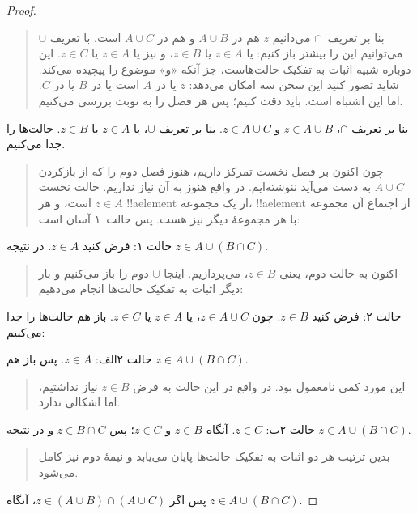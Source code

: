 \documentclass[../../../include/open-logic-section]{subfiles}
\begin{document}
\begin{proof}
\begin{quote}
بنا بر تعریف~$\cap$ می‌دانیم $z$ هم در $A \cup B$ و هم در $A \cup C$
است. با تعریف $\cup$ می‌توانیم این را بیشتر باز کنیم: یا $z \in A$ یا
$z \in B$، و نیز یا $z \in A$ یا $z \in C$. این دوباره شبیه اثبات به
تفکیک حالت‌هاست، جز آنکه «و» موضوع را پیچیده می‌کند. شاید تصور کنید
این سخن سه امکان می‌دهد: $z$ یا در $A$ است یا در $B$ یا در $C$. اما
این اشتباه است. باید دقت کنیم؛ پس هر فصل را به نوبت بررسی می‌کنیم.
\end{quote}
بنا بر تعریف $\cap$، $z \in A \cup B$ و $z \in A \cup C$. بنا بر
تعریف $\cup$، یا $z \in A$ یا $z \in B$. حالت‌ها را جدا می‌کنیم.
\begin{quote}
چون اکنون بر فصل نخست تمرکز داریم، هنوز فصل دوم را که از بازکردن
$A \cup C$ به دست می‌آید ننوشته‌ایم. در واقع هنوز به آن نیاز نداریم.
حالت نخست $z \in A$ است، و هر !!a{element} از یک مجموعه، !!a{element}
از اجتماع آن مجموعه با هر مجموعهٔ دیگر نیز هست. پس حالت~۱ آسان است:
\end{quote}
حالت ۱: فرض کنید $z \in A$. در نتیجه $z \in A \cup (B \cap C)$.
\begin{quote}
اکنون به حالت دوم، یعنی $z \in B$، می‌پردازیم. اینجا $\cup$ دوم را
باز می‌کنیم و بار دیگر اثبات به تفکیک حالت‌ها انجام می‌دهیم:
\end{quote}
حالت ۲: فرض کنید $z \in B$. چون $z \in A \cup C$، یا $z \in A$ یا
$z \in C$. باز هم حالت‌ها را جدا می‌کنیم:

حالت ۲الف: $z \in A$. پس باز هم $z \in A \cup (B \cap C)$.
\begin{quote}
این مورد کمی نامعمول بود. در واقع در این حالت به فرض $z \in B$ نیاز
نداشتیم، اما اشکالی ندارد.
\end{quote}
حالت ۲ب: $z \in C$. آنگاه $z \in B$ و $z \in C$؛ پس
$z \in B \cap C$ و در نتیجه $z \in A \cup (B \cap C)$.
\begin{quote}
بدین ترتیب هر دو اثبات به تفکیک حالت‌ها پایان می‌یابد و نیمهٔ دوم نیز
کامل می‌شود.
\end{quote}
پس اگر $z \in (A \cup B) \cap (A \cup C)$، آنگاه
$z \in A \cup (B \cap C)$.
\end{proof}
\end{document}

